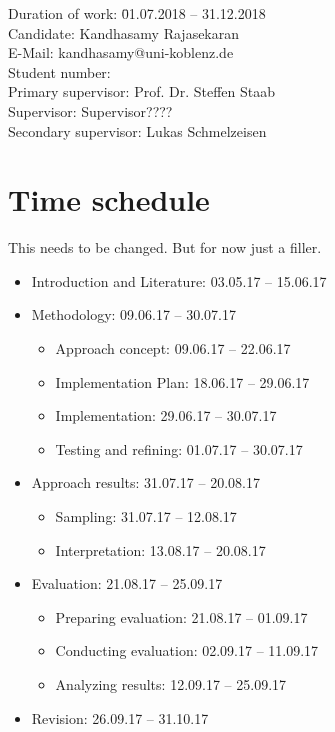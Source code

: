 \documentclass[a4paper, 11pt]{article}
\makeatletter
\newcommand{\myName}{Kandhasamy Rajasekaran}
\newcommand{\emailID}{kandhasamy@uni-koblenz.de}
\newcommand{\matriculationID}{216100855}
\newcommand{\StartDate}{01.07.2018}
\newcommand{\EndDate}{31.12.2018}
\newcommand{\expert}{Prof. Dr. Steffen Staab}%
\newcommand{\supervisor}{Supervisor????} %
\newcommand{\scndSupervisor}{Lukas Schmelzeisen} %
\makeatother
\begin{document}
\begin{tabbing}
Duration of work: \hspace{1.1cm} \= \StartDate{} -- \EndDate{}\\
\vspace{0.5ex}Candidate:	\> \myName{}\\
\vspace{0.5ex}E-Mail:	\> \emailID{}\\
\vspace{0.5ex}Student number: \> \matriculationID{}\\
\vspace{0.5ex}Primary supervisor: \> \expert{}\\
Supervisor: \> \supervisor{}\\
Secondary supervisor: \> \scndSupervisor{}\\
\end{tabbing}


\section{Time schedule}

This needs to be changed. But for now just a filler.

\begin{itemize}
	\item Introduction and Literature: 03.05.17 – 15.06.17
	\item Methodology: 09.06.17 – 30.07.17
	\begin{itemize}
		\item Approach concept: 09.06.17 – 22.06.17
		\item Implementation Plan: 18.06.17 – 29.06.17
        \item Implementation: 29.06.17 – 30.07.17
        \item Testing and refining: 01.07.17 – 30.07.17
	\end{itemize}
	\item Approach results: 31.07.17 – 20.08.17
	\begin{itemize}
		\item Sampling: 31.07.17 – 12.08.17
		\item Interpretation: 13.08.17 – 20.08.17
	\end{itemize}
	\item Evaluation: 21.08.17 – 25.09.17
	\begin{itemize}
		\item Preparing evaluation: 21.08.17 – 01.09.17
		\item Conducting evaluation: 02.09.17 – 11.09.17
		\item Analyzing results: 12.09.17 – 25.09.17
	\end{itemize}
	\item Revision: 26.09.17 – 31.10.17
\end{itemize}
\end{document}
